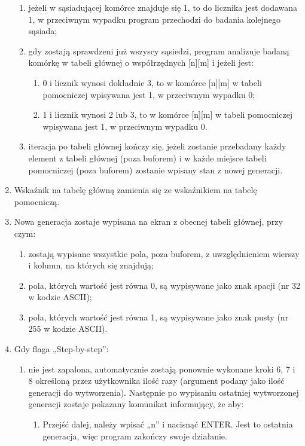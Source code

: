 \documentclass[12pt]{report}
\begin{document}
\begin{enumerate}
\begin{enumerate}
    \item jeżeli w sąsiadującej komórce znajduje się 1, to do licznika jest dodawana 1, w przeciwnym wypadku program przechodzi do badania kolejnego sąsiada;
    \item gdy zostają sprawdzeni już wszyscy sąsiedzi, program analizuje badaną komórkę w tabeli głównej o współrzędnych [n][m] i jeżeli jest:
    \begin{enumerate}
        \item 0 i licznik wynosi dokładnie 3, to w komórce [n][m] w tabeli pomocniczej wpisywana jest 1, w przeciwnym wypadku 0;
        \item 1 i licznik wynosi 2 lub 3, to w komórce [n][m] w tabeli pomocniczej wpisywana jest 1, w przeciwnym wypadku 0.
    \end{enumerate}
    \item iteracja po tabeli głównej kończy się, jeżeli zostanie przebadany każdy element z tabeli głównej (poza buforem) i w każde miejsce tabeli pomocniczej (poza buforem) zostanie wpisany stan z nowej generacji.
\end{enumerate}
\item Wskaźnik na tabelę główną zamienia się ze wskaźnikiem na tabelę pomocniczą.
\item Nowa generacja zostaje wypisana na ekran z obecnej tabeli głównej, przy czym:
\begin{enumerate}
    \item zostają wypisane wszystkie pola, poza buforem, z uwzględnieniem wierszy i kolumn, na których się znajdują;
    \item pola, których wartość jest równa 0, są wypisywane jako znak spacji (nr 32 w kodzie ASCII);
    \item pola, których wartość jest równa 1, są wypisywane jako znak pusty (nr 255 w kodzie ASCII).
\end{enumerate}
\item Gdy flaga „Step-by-step”:
\begin{enumerate}
    \item nie jest zapalona, automatycznie zostają ponownie wykonane kroki 6, 7 i 8 określoną przez użytkownika ilość razy (argument podany jako ilość generacji do wytworzenia). Następnie po wypisaniu ostatniej wytworzonej generacji zostaje pokazany komunikat informujący, że aby:
    \begin{enumerate}
        \item Przejść dalej, należy wpisać „n” i nacisnąć ENTER. Jest to ostatnia generacja, więc program zakończy swoje działanie.

\end{enumerate}
\end{enumerate}
\end{enumerate}
\end{document}
